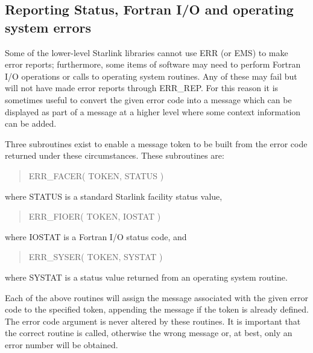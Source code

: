 \documentclass[twoside,11pt]{starlink}
\begin{document}
\subsection{Reporting Status, Fortran I/O and operating system errors
\label{fio_sect}}
Some of the lower-level Starlink libraries cannot use ERR (or EMS) to make
error reports; furthermore, some items of software may need to perform Fortran
I/O operations or calls to operating system routines. Any of these may fail
but will not have made error reports through ERR\_REP.
For this reason it is sometimes useful to convert the given error code into
a message which can be displayed as part of a message at a higher level where
some context information can be added.

Three subroutines exist to enable a message token to be built from
the error code returned under these circumstances.
These subroutines are:

\begin {quote}
\begin {small}
\begin{terminalv}
ERR_FACER( TOKEN, STATUS )
\end{terminalv}
\end {small}
\end {quote}
where STATUS is a standard Starlink facility status value,
\begin {quote}
\begin {small}
\begin{terminalv}
ERR_FIOER( TOKEN, IOSTAT )
\end{terminalv}
\end {small}
\end {quote}
where IOSTAT is a Fortran I/O status code, and
\begin {quote}
\begin {small}
\begin{terminalv}
ERR_SYSER( TOKEN, SYSTAT )
\end{terminalv}
\end {small}
\end {quote}
where SYSTAT is a status value returned from an operating system routine.

Each of the above routines will assign the message associated with the given
error code to the specified token, appending the message if the token is already
defined. The error code argument is never altered by these routines.
It is important that the correct routine is called, otherwise the wrong message
or, at best, only an error number will be obtained.
\end{document}
